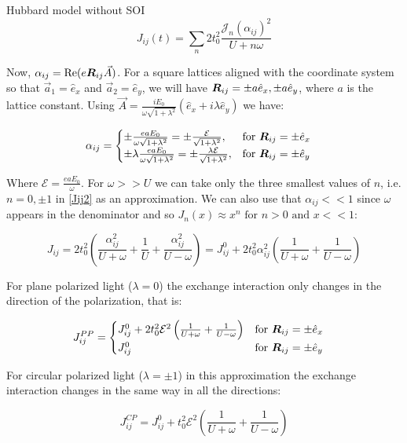 \begin{section}{Hubbard model without SOI}
\begin{equation}
\label{Jij2}
J_{ij}(t) = \sum_{n} 2t_0^2 \frac{\mathcal{J}_n(\alpha_{ij})^2}{U+n\omega}
\end{equation}

Now, $\alpha_{ij} = \text{Re}(e\boldsymbol{R}_{ij}\vec{A})$. For a square lattices aligned with the coordinate system so that $\vec{a}_1=\hat{e}_x$ and $\vec{a}_2=\hat{e}_y$, we will have $\boldsymbol{R}_{ij} = \pm a\hat{e}_x,\pm a\hat{e}_y$, where $a$ is the lattice constant. Using $\vec{A}=\frac{iE_0}{\omega\sqrt{1+\lambda^2}}(\hat{e}_x+i\lambda\hat{e}_y)$ we have:

\begin{equation}
\alpha_{ij} = \begin{cases}
             \pm \frac{eaE_0}{\omega \sqrt{1+\lambda^2}} = \pm \frac{\mathcal{E}}{\sqrt{1+\lambda^2}},  & \text{for } \boldsymbol{R}_{ij} = \pm \hat{e}_x \\
             \pm \lambda\frac{eaE_0}{\omega \sqrt{1+\lambda^2}} = \pm \frac{\lambda \mathcal{E}}{\sqrt{1+\lambda^2}},  & \text{for } \boldsymbol{R}_{ij} = \pm \hat{e}_y
       \end{cases} \quad
\end{equation}

Where $\mathcal{E} = \frac{eaE_0}{\omega}$. For $\omega>>U$ we can take only the three smallest values of $n$, i.e. $n=0, \pm 1$ in \ref{Jij2} as an approximation. We can also use that $\alpha_{ij} << 1$ since $\omega$ appears in the denominator and so $J_n(x) \approx x^n \text{ for } n>0 \text{ and } x << 1$:

\begin{equation}
J_{ij} = 2t_0^2 \left(\frac{\alpha_{ij}^2}{U+\omega} +\frac{1}{U} +\frac{\alpha_{ij}^2}{U-\omega} \right) = J_{ij}^0 + 2t_0^2 \alpha_{ij}^2 \left( \frac{1}{U+\omega} + \frac{1}{U-\omega} \right)
\end{equation}

For plane polarized light ($\lambda = 0$) the exchange interaction only changes in the direction of the polarization, that is:

\begin{equation}
J_{ij}^{PP} = \begin{cases}
		J_{ij}^0 + 2t_0^2 \mathcal{E}^2 \left( \frac{1}{U+\omega} + \frac{1}{U-\omega} \right) & \text{for } \boldsymbol{R}_{ij} = \pm \hat{e}_x \\
J_{ij}^0 & \text{for } \boldsymbol{R}_{ij} = \pm \hat{e}_y
\end{cases} \quad 
\end{equation}

For circular polarized light ($\lambda=\pm1$) in this approximation the exchange interaction changes in the same way in all the directions:

\begin{equation}
J_{ij}^{CP} = J_{ij}^0 + t_0^2 \mathcal{E}^2 \left( \frac{1}{U+\omega} + \frac{1}{U-\omega} \right)
\end{equation}

\end{section}


